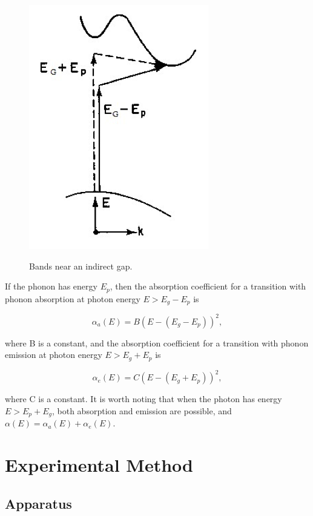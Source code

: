 \documentclass{article}
\begin{document}
\begin{figure}[!htb]
	\centering
	\includegraphics[scale=1.]{plots/fig_7.png}
 	\label{indirect}
	\caption{Bands near an indirect gap.\cite{lab manual}}
\end{figure}

If the phonon has energy $E_p$, then the absorption coefficient for a transition with phonon absorption at photon energy $E > E_g - E_p$ is

\begin{equation}
	\alpha_a(E) = B(E - (E_g - E_p))^2,
\end{equation}

where B is a constant, and the absorption coefficient for a transition with phonon emission at photon energy $E > E_g + E_p$ is

\begin{equation}
	\alpha_e(E) = C(E - (E_g + E_p))^2,
\end{equation}

where C is a constant. It is worth noting that when the photon has energy $E > E_p + E_g$, both absorption and emission are possible, and $\alpha(E) = \alpha_a(E) + \alpha_e(E)$.


\section{Experimental Method}
\subsection{Apparatus}
\end{document}

